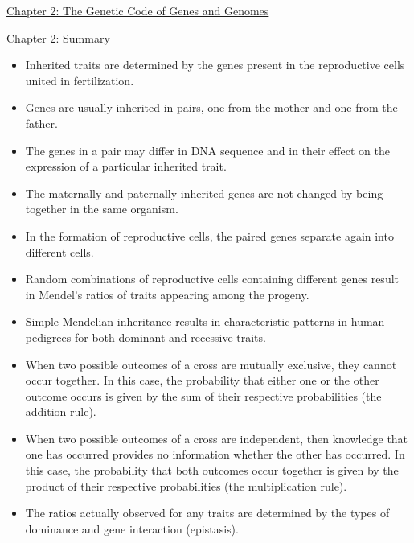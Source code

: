 \documentclass[12pt,letterpaper]{article}
\newcommand{\thetitle}{\hypertarget{home}{Essential Genetics and Genomics}}
\begin{document}
\clearpage

\renewcommand{\thetitle}{\hypertarget{2}{The Genetic Code of Genes
and Genomes}}
\hypertarget{2}{} 
\hypertarget{2.r}{}
\begin{chapbox}{\hyperlink{home}{Chapter 2: The Genetic Code of Genes and Genomes}}
\begin{probbox}{Chapter 2: Summary}{
    \begin{itemize}
        \item Inherited traits are determined by the genes present in the reproductive cells united in fertilization. 
        \item Genes are usually inherited in pairs, one from the mother and one from the father. 
        \item The genes in a pair may differ in DNA sequence and in their effect on the expression of a particular inherited trait. 
        \item The maternally and paternally inherited genes are not changed by being together in the same organism. 
        \item In the formation of reproductive cells, the paired genes separate again into different cells. 
        \item Random combinations of reproductive cells containing different genes result in Mendel’s ratios of traits appearing among the progeny. 
        \item Simple Mendelian inheritance results in characteristic patterns in human pedigrees for both dominant and recessive traits. 
        \item When two possible outcomes of a cross are mutually exclusive, they cannot occur together. In this case, the probability that either one or the other outcome occurs is given by the sum of their respective probabilities (the addition rule). 
        \item When two possible outcomes of a cross are independent, then knowledge that one has occurred provides no information whether the other has occurred. In this case, the probability that both outcomes occur together is given by the product of their respective probabilities (the multiplication rule). 
        \item The ratios actually observed for any traits are determined by the types of dominance and gene interaction (epistasis).
    \end{itemize}
}\end{probbox}
\end{chapbox}
\end{document}
